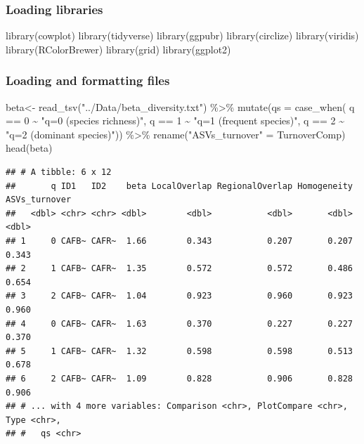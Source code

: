 \documentclass[]{interact}
\theoremstyle{plain}%
\theoremstyle{definition}
\theoremstyle{remark}
\newenvironment{Shaded}{\begin{snugshade}}{\end{snugshade}}
\newcommand{\AttributeTok}[1]{\textcolor[rgb]{0.77,0.63,0.00}{#1}}
\newcommand{\DecValTok}[1]{\textcolor[rgb]{0.00,0.00,0.81}{#1}}
\newcommand{\FunctionTok}[1]{\textcolor[rgb]{0.00,0.00,0.00}{#1}}
\newcommand{\NormalTok}[1]{#1}
\newcommand{\OtherTok}[1]{\textcolor[rgb]{0.56,0.35,0.01}{#1}}
\newcommand{\SpecialCharTok}[1]{\textcolor[rgb]{0.00,0.00,0.00}{#1}}
\newcommand{\StringTok}[1]{\textcolor[rgb]{0.31,0.60,0.02}{#1}}
\begin{document}
\hypertarget{loading-libraries-1}{%
\subsubsection{Loading libraries}\label{loading-libraries-1}}

\begin{Shaded}
\begin{Highlighting}[]
\FunctionTok{library}\NormalTok{(cowplot)}
\FunctionTok{library}\NormalTok{(tidyverse)}
\FunctionTok{library}\NormalTok{(ggpubr)}
\FunctionTok{library}\NormalTok{(circlize)}
\FunctionTok{library}\NormalTok{(viridis)}
\FunctionTok{library}\NormalTok{(RColorBrewer)}
\FunctionTok{library}\NormalTok{(grid)}
\FunctionTok{library}\NormalTok{(ggplot2)}
\end{Highlighting}
\end{Shaded}

\hypertarget{loading-and-formatting-files}{%
\subsubsection{Loading and formatting
files}\label{loading-and-formatting-files}}

\begin{Shaded}
\begin{Highlighting}[]
\NormalTok{beta}\OtherTok{\textless{}{-}} \FunctionTok{read\_tsv}\NormalTok{(}\StringTok{"../Data/beta\_diversity.txt"}\NormalTok{) }\SpecialCharTok{\%\textgreater{}\%} \FunctionTok{mutate}\NormalTok{(}\AttributeTok{qs =} \FunctionTok{case\_when}\NormalTok{(}
\NormalTok{  q }\SpecialCharTok{==} \DecValTok{0}  \SpecialCharTok{\textasciitilde{}} \StringTok{"q=0 (species richness)"}\NormalTok{,}
\NormalTok{  q }\SpecialCharTok{==} \DecValTok{1} \SpecialCharTok{\textasciitilde{}} \StringTok{"q=1 (frequent species)"}\NormalTok{,}
\NormalTok{  q }\SpecialCharTok{==} \DecValTok{2} \SpecialCharTok{\textasciitilde{}} \StringTok{"q=2 (dominant species)"}\NormalTok{)) }\SpecialCharTok{\%\textgreater{}\%} \FunctionTok{rename}\NormalTok{(}\StringTok{"ASVs\_turnover"} \OtherTok{=}\NormalTok{ TurnoverComp)}
\FunctionTok{head}\NormalTok{(beta)}
\end{Highlighting}
\end{Shaded}

\begin{verbatim}
## # A tibble: 6 x 12
##       q ID1   ID2    beta LocalOverlap RegionalOverlap Homogeneity ASVs_turnover
##   <dbl> <chr> <chr> <dbl>        <dbl>           <dbl>       <dbl>         <dbl>
## 1     0 CAFB~ CAFR~  1.66        0.343           0.207       0.207         0.343
## 2     1 CAFB~ CAFR~  1.35        0.572           0.572       0.486         0.654
## 3     2 CAFB~ CAFR~  1.04        0.923           0.960       0.923         0.960
## 4     0 CAFB~ CAFR~  1.63        0.370           0.227       0.227         0.370
## 5     1 CAFB~ CAFR~  1.32        0.598           0.598       0.513         0.678
## 6     2 CAFB~ CAFR~  1.09        0.828           0.906       0.828         0.906
## # ... with 4 more variables: Comparison <chr>, PlotCompare <chr>, Type <chr>,
## #   qs <chr>
\end{verbatim}
\end{document}
